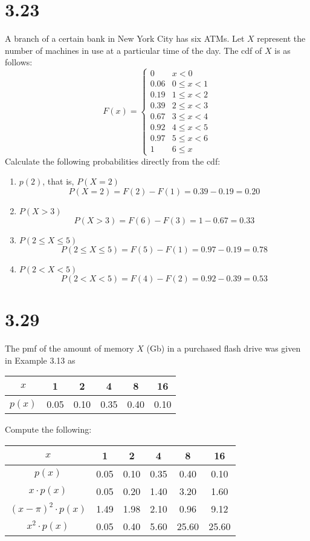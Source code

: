 \documentclass[letterpaper,12pt,fleqn]{article}
\begin{document}
\section*{3.23}

A branch of a certain bank in New York City has six ATMs.  Let \(X\) represent the number of machines in use at a particular
time of the day.  The cdf of \(X\) is as follows:
\[F(x)=\begin{cases}
0 & x < 0 \\
0.06 & 0\le x<1 \\
0.19 & 1\le x<2 \\
0.39 & 2\le x<3 \\
0.67 & 3\le x<4 \\
0.92 & 4\le x<5 \\
0.97 & 5\le x<6 \\
1 & 6\le x
\end{cases}\]
Calculate the following probabilities directly from the cdf:
\begin{enumerate}[label={\alph*)}]
\item \(p(2)\), that is, \(P(X=2)\)
  \[P(X=2)=F(2)-F(1)=0.39-0.19=0.20\]
\item \(P(X>3)\)
  \[P(X>3)=F(6)-F(3)=1-0.67=0.33\]
\item \(P(2\le X\le5)\)
  \[P(2\le X\le5)=F(5)-F(1)=0.97-0.19=0.78\]
\item \(P(2<X<5)\)
  \[P(2<X<5)=F(4)-F(2)=0.92-0.39=0.53\]
\end{enumerate}

\section*{3.29}

The pmf of the amount of memory \(X\) (Gb) in a purchased flash drive was given in Example 3.13 as

\bigskip

\begin{tabular}{c|ccccc}
  \(x\) & 1 & 2 & 4 & 8 & 16 \\
  \hline
  \(p(x)\) & 0.05 & 0.10 & 0.35 & 0.40 & 0.10
\end{tabular}

\bigskip

Compute the following:

\bigskip

\begin{tabular}{c|ccccc}
  \(x\) & 1 & 2 & 4 & 8 & 16 \\
  \hline
  \(p(x)\) & 0.05 & 0.10 & 0.35 & 0.40 & 0.10 \\
  \hline
  \(x\cdot p(x)\) & 0.05 & 0.20 & 1.40 & 3.20 & 1.60 \\
  \hline
  \((x-\pi)^2\cdot p(x)\) & 1.49 & 1.98 & 2.10 & 0.96 & 9.12 \\
  \hline
  \(x^2\cdot p(x)\) & 0.05 & 0.40 & 5.60 & 25.60 & 25.60
\end{tabular}
\end{document}

